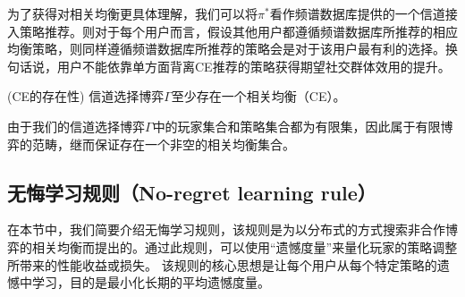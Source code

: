 为了获得对相关均衡更具体理解，我们可以将$\pi^*$看作频谱数据库提供的一个信道接入策略推荐。则对于每个用户而言，假设其他用户都遵循频谱数据库所推荐的相应均衡策略，则同样遵循频谱数据库所推荐的策略会是对于该用户最有利的选择。换句话说，用户不能依靠单方面背离CE推荐的策略获得期望社交群体效用的提升。

\begin{thm}(CE的存在性)
信道选择博弈$\Gamma$至少存在一个相关均衡（CE）。
\end{thm}
由于我们的信道选择博弈$\Gamma$中的玩家集合和策略集合都为有限集，因此属于有限博弈的范畴，继而保证存在一个非空的相关均衡集合\cite{Lasaulce2011}。


\subsection{无悔学习规则（No-regret learning rule）}\label{sec:noregret}
在本节中，我们简要介绍无悔学习规则，该规则是为以分布式的方式搜索非合作博弈的相关均衡而提出的\cite{Hart00asimple}。通过此规则，可以使用“遗憾度量”来量化玩家的策略调整所带来的性能收益或损失。
该规则的核心思想是让每个用户从每个特定策略的遗憾中学习，目的是最小化长期的平均遗憾度量。

